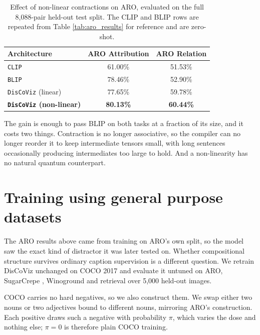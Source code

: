 \documentclass[12pt, a4paper, oneside]{report}
\begin{document}
\begin{table}[hbt!]
    \centering
    \begin{tabular}{l c c}
        \toprule
        \textbf{Architecture} & \textbf{ARO Attribution} & \textbf{ARO Relation} \\
        \midrule
        \texttt{CLIP} \cite{radford2021learning} & 61.00\% & 51.53\% \\
        \texttt{BLIP} & 78.46\% & 52.90\% \\
        \midrule
        \texttt{DisCoViz} (linear) & 77.65\% & 59.78\% \\
        \textbf{\texttt{DisCoViz} (non-linear)} & \textbf{80.13\%} & \textbf{60.44\%} \\
        \bottomrule
    \end{tabular}
    \caption{Effect of non-linear contractions on ARO, evaluated on the full 8,088-pair held-out test split. The CLIP and BLIP rows are repeated from Table \ref{tab:aro_results} for reference and are zero-shot.}
    \label{tab:nlc_results}
\end{table}

The gain is enough to pass BLIP on both tasks at a fraction of its size, and it costs two things. Contraction is no longer associative, so the compiler can no longer reorder it to keep intermediate tensors small, with long sentences occasionally producing intermediates too large to hold. And a non-linearity has no natural quantum counterpart.

\section{Training using general purpose datasets}

The ARO results above came from training on ARO's own split, so the model saw the exact kind of distractor it was later tested on. Whether compositional structure survives ordinary caption supervision is a different question. We retrain DisCoViz unchanged on COCO 2017 \cite{lin2014coco} and evaluate it untuned on ARO, SugarCrepe \cite{hsieh2023sugarcrepe}, Winoground \cite{thrush2022winoground} and retrieval over 5,000 held-out images.

COCO carries no hard negatives, so we also construct them. We swap either two nouns or two adjectives bound to different nouns, mirroring ARO's construction. Each positive draws such a negative with probability $\pi$, which varies the dose and nothing else; $\pi = 0$ is therefore plain COCO training.
\end{document}
